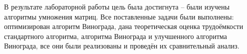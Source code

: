 \Conclusion %
В результате лабораторной работы цель была достигнута -- были изучены алгоритмы умножения матриц. Все поставленные задачи были выполнены: оптимизирован алгоритм Винограда, дана теоретическая оценка трудоёмкости стандартного алгоритма, алгоритма Винограда и улучшенного алгоритма Винограда, все они были реализованы и проведён их сравнительный анализ.